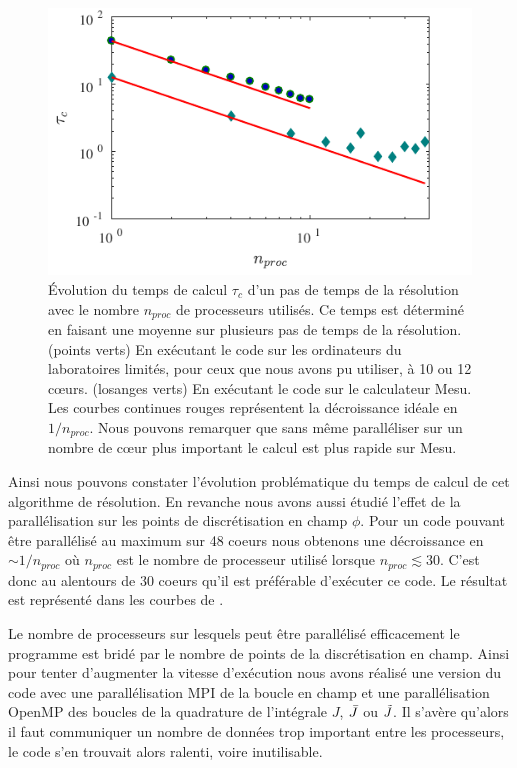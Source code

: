 \documentclass[10.5pt]{article}
\begin{document}
\begin{multicols}{2}
\begin{figure}[H]
\begin{center}
	\includegraphics[width=0.95\columnwidth]{Scalabilite.pdf}
\end{center}
\caption{Évolution du temps de calcul $\tau_c$ d'un pas de temps de la résolution avec le nombre $n_{proc}$ de processeurs utilisés. Ce temps est déterminé en faisant une moyenne sur  plusieurs pas de temps de la résolution. (points verts) En exécutant le code sur les ordinateurs du laboratoires limités, pour ceux que nous avons pu utiliser, à 10 ou 12 cœurs. (losanges verts) En exécutant le code sur le calculateur Mesu. Les courbes continues rouges représentent la décroissance idéale en $1/n_{proc}$. Nous pouvons remarquer que sans même paralléliser sur un nombre de cœur plus important le calcul est plus rapide sur Mesu.}
\label{fig:timeScal}
\end{figure}


Ainsi nous pouvons constater l'évolution problématique du temps de calcul de cet algorithme de résolution. En revanche nous avons aussi étudié l'effet de la parallélisation sur les points de discrétisation en champ $\phi$. Pour un code pouvant être parallélisé au maximum sur 48 coeurs nous obtenons une décroissance en $\sim 1/n_{proc}$ où $n_{proc}$ est le nombre de processeur utilisé lorsque $n_{proc} \lesssim 30$. C'est donc au alentours de $30$ coeurs qu'il est préférable d'exécuter ce code. Le résultat est représenté dans les courbes de .

Le nombre de processeurs sur lesquels peut être parallélisé efficacement le programme est bridé par le nombre de points de la discrétisation en champ. Ainsi pour tenter d'augmenter la vitesse d'exécution nous avons réalisé une version du code avec une parallélisation MPI \cite{open2012open} de la boucle en champ et une parallélisation OpenMP des boucles de la quadrature de l'intégrale $J$, $\bar{J}$ ou $\tilde{J}$. Il s'avère qu'alors il faut communiquer un nombre de données trop important entre les processeurs, le code s'en trouvait alors ralenti, voire inutilisable. 








\end{multicols}
\end{document}
